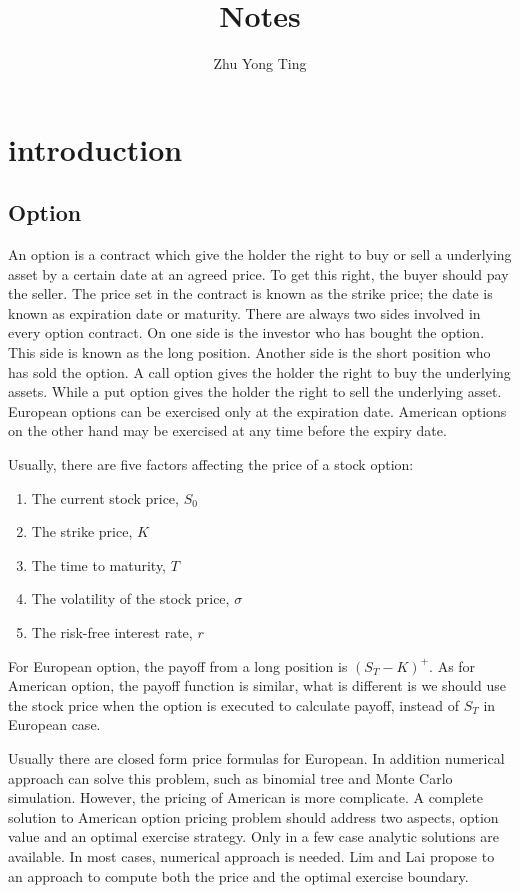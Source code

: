 \documentclass[11pt]{book}
\title{Notes}
\author{Zhu Yong Ting}
\begin{document}
\maketitle
\chapter{introduction}
\section{Option}

An option is a contract which give the holder the right to buy or sell a underlying asset by a certain date at an agreed price. To get this right, the buyer should pay the seller. The price set in the contract is known as the strike price; the date is known as expiration date or maturity. There are always two sides involved in every option contract. On one side  is the investor who has bought the option. This side is known as the long position. Another side is the short position who has sold the option. A call option gives the holder the right to buy the underlying assets. While a put option gives the holder the right to sell the underlying asset. European options can be exercised only at the expiration date. American options on the other hand may be exercised at any time before the expiry date. 

Usually, there are five factors affecting the price of a stock option:
\begin{enumerate}[1.]
\item The current stock price, $S_0$
\item The strike price, $K$
\item The time to maturity, $T$
\item The volatility of the stock price, $\sigma$
\item The risk-free interest rate, $r$
\end{enumerate}

For European option, the payoff from a long position is $(S_T - K)^+$. As for American option, the payoff function is
similar, what is different is we should use the stock price when the option is executed to calculate payoff, instead of $S_T$ in European case. 

Usually there are closed form price formulas for European. In addition numerical approach can solve this problem, such as binomial tree and Monte Carlo simulation. However, the pricing of    American is more complicate. A complete solution to American option pricing problem should address two aspects, option value and an optimal exercise strategy. Only in a few case analytic solutions are available. In most cases, numerical approach is needed. Lim and Lai \cite{Lim2004} propose to an approach to compute both the price and the optimal exercise boundary. 
\end{document}
